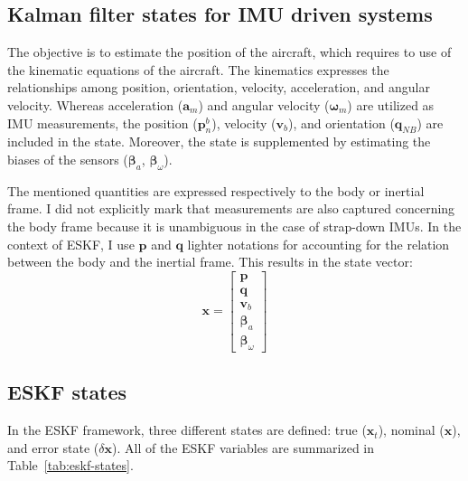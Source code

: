 \subsection{Kalman filter states for IMU driven systems}

The objective is to estimate the position of the aircraft, which requires to use of the kinematic equations of the aircraft. The kinematics expresses the relationships among position, orientation, velocity, acceleration, and angular velocity. Whereas acceleration ($\mathbf{a}_m$) and angular velocity ($\boldsymbol{\omega}_m$) are utilized as IMU measurements, the position ($\mathbf{p}_n^b$), velocity ($\mathbf{v}_b$), and orientation ($\mathbf{q}_{NB}$) are included in the state. Moreover, the state is supplemented by estimating the biases of the sensors ($\boldsymbol{\beta}_a$, $\boldsymbol{\beta}_\omega$). 

The mentioned quantities are expressed respectively to the body or inertial frame. I did not explicitly mark that measurements are also captured concerning the body frame because it is unambiguous in the case of strap-down IMUs. In the context of ESKF, I use $\mathbf{p}$ and $\mathbf{q}$ lighter notations for accounting for the relation between the body and the inertial frame. This results in the state vector:
\begin{equation}
    \mathbf{x}=\begin{bmatrix}
    \mathbf{p} \\ \mathbf{q} \\ \mathbf{v}_b \\ \boldsymbol{\beta}_a \\ \boldsymbol{\beta}_\omega
    \end{bmatrix}
\end{equation}

\subsection{ESKF states}

In the ESKF framework, three different states are defined: true ($\mathbf{x}_t$), nominal ($\mathbf{x}$), and error state ($\delta\mathbf{x}$). All of the ESKF variables are summarized in Table~\ref{tab:eskf-states}.

